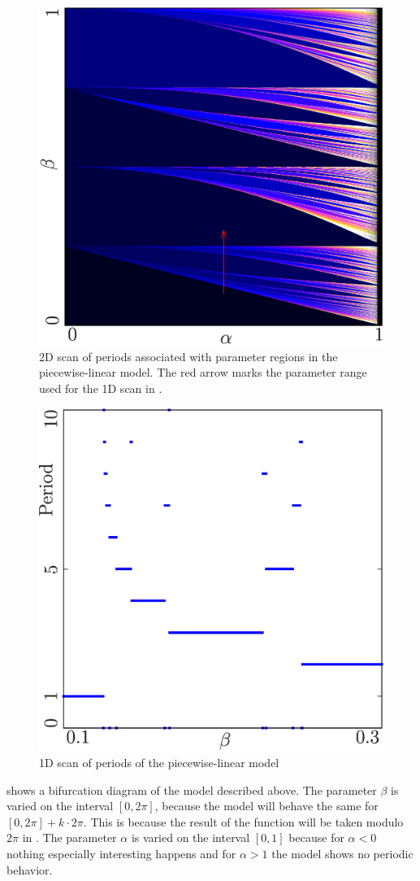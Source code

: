 \begin{figure}
	\centering
	\includegraphics[width=0.7 \textwidth]{../Figures/A/A.1/result.png}
	\caption[2D scan of periods associated with parameter regions in the piecewise-linear model]{
		2D scan of periods associated with parameter regions in the piecewise-linear model.
		The red arrow marks the parameter range used for the 1D scan in .
	}
	\label{fig:app.model.lin.2D}
\end{figure}

\begin{figure}
	\centering
	\includegraphics[width=0.7 \textwidth]{../Figures/A/A.2/result.png}
	\caption{1D scan of periods of the piecewise-linear model}
	\label{fig:app.model.lin.1D}
\end{figure}

 shows a bifurcation diagram of the model described above.
The parameter $\beta$ is varied on the interval $[0, 2 \pi]$, because the model will behave the same for $[0, 2 \pi] + k \cdot 2 \pi$.
This is because the result of the function will be taken modulo $2 \pi$ in .
The parameter $\alpha$ is varied on the interval $[0, 1]$ because for $\alpha < 0$ nothing especially interesting happens and for $\alpha > 1$ the model shows no periodic behavior.

